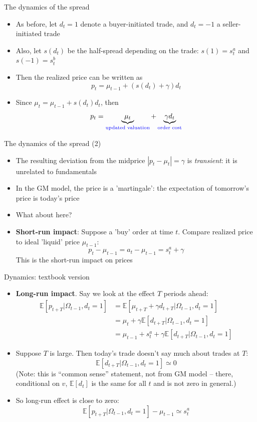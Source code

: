 \documentclass[english,10pt]{beamer}
\begin{document}
\begin{frame}{The dynamics of the spread}
	\begin{itemize}
		\item As before, let $d_{t}=1$ denote a buyer-initiated trade, and $d_{t} = -1$ a seller-initiated trade
		\item Also, let $s(d_{t})$ be the half-spread depending on the trade: $s(1)=s^{a}_{t}$ and $s(-1)=s^{b}_{t}$
		\item Then the realized price can be written as
		\[
		p_{t} = \mu_{t-1} + (s(d_{t}) + \gamma) d_{t}
		\]
		\item Since $\mu_{t} = \mu_{t-1} + s(d_{t}) d_{t}$, then
		\[
		p_{t}  = \underbrace{\mu_{t}}_{\textcolor{blue}{\text{updated valuation}}} + \underbrace{\gamma d_{t}}_{\textcolor{blue}{\text{order cost}}}
		\]
	\end{itemize}
\end{frame}


\begin{frame}{The dynamics of the spread (2)}
	\begin{itemize}
		\item The resulting deviation from the midprice $|p_{t}-\mu_{t}|=\gamma$ is \textit{transient}: it is unrelated to fundamentals
		\item In the GM model, the price is a 'martingale': the expectation of tomorrow's price is today's price
		\item What about here? 
		\item \textbf{Short-run impact}: Suppose a 'buy' order at time $t$. Compare realized price to ideal 'liquid' price $\mu_{t-1}$:
		\[
		p_{t}  - \mu_{t-1} = a_{t} - \mu_{t-1} = s^{a}_{t} + \gamma
		\]
		This is the short-run impact on prices
	\end{itemize}
\end{frame}


\begin{frame}{Dynamics: textbook version}
	\begin{itemize}
		\item \textbf{Long-run impact}. Say we look at the effect $T$ periods ahead:
		\begin{align*}
		\mathbb{E}[p_{t+T}|\Omega_{t-1}, d_{t}=1]
		& = \mathbb{E}[\mu_{t+T}+ \gamma d_{t+T}|\Omega_{t-1}, d_{t}=1] \\
		& = \mu_{t} + \gamma \mathbb{E}[d_{t+T}|\Omega_{t-1}, d_{t}=1] \\
		& = \mu_{t-1} + s^{a}_{t}+ \gamma \mathbb{E}[d_{t+T}|\Omega_{t-1}, d_{t}=1] 
		\end{align*}
		\item Suppose $T$ is large. Then today's trade doesn't say much about trades at $T$:
		\[
		\mathbb{E}[d_{t+T}|\Omega_{t-1}, d_{t}=1]  \simeq 0
		\]
		{\small (Note: this is ``common sense'' statement, not from GM model -- there, conditional on $v$, $\mathbb{E}[d_t]$ is the same for all $t$ and is not zero in general.)}
		\item So long-run effect is close to zero:
		\[
		\mathbb{E}[p_{t+T}|\Omega_{t-1}, d_{t}=1] - \mu_{t-1} \simeq s^{a}_{t}
		\]
	\end{itemize}
\end{frame}
\end{document}
